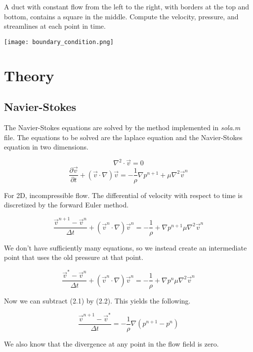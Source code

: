 \documentclass[listof=totoc]{report}
\begin{document}
A duct with constant flow from the left to the right, with borders at the top and bottom, contains a square in the middle. Compute the velocity, pressure, and streamlines at each point in time. \\

\begin{center}
\texttt{[image: boundary\_condition.png]}
\end{center}

\chapter{Theory}
\section{Navier-Stokes}
The Navier-Stokes equations are solved by the method implemented in \emph{sola.m} file. The equations to be solved are the laplace equation and the Navier-Stokes equation in two dimensions.

$$ \nabla^2 \cdot \vec{v} = 0 $$
$$ \frac{\partial \vec{v}}{\partial t} + (\vec{v} \cdot \nabla) \vec{v} = -\frac{1}{\rho} \nabla p^{n+1} + \mu \nabla^2 \vec{v}^n $$

For 2D, incompressible flow.
The differential of velocity with respect to time is discretized by the forward Euler method.

\begin{equation}
\frac{\vec{v}^{n+1} - \vec{v}^n}{\Delta t} + (\vec{v}^n \cdot \nabla) \vec{v}^n = -\frac{1}{\rho} + \nabla p^{n+1} \mu \nabla^2 \vec{v}^n
\end{equation}

We don't have sufficiently many equations, so we instead create an intermediate point that uses the old pressure at that point.

\begin{equation}
\frac{\vec{v}^{*} - \vec{v}^n}{\Delta t} + (\vec{v}^n \cdot \nabla) \vec{v}^n = -\frac{1}{\rho} + \nabla p^{n} \mu \nabla^2 \vec{v}^n
\end{equation}

Now we can subtract (2.1) by (2.2). This yields the following.

\begin{equation}
\frac{\vec{v}^{n+1} - \vec{v}^*}{\Delta t} = -\frac{1}{\rho} \nabla (p^{n+1} - p^{n})
\end{equation}

We also know that the divergence at any point in the flow field is zero.
\end{document}
